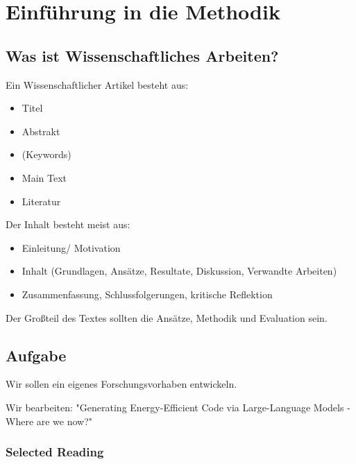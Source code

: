 \documentclass[a4paper]{article}
\title{\docTitle}
\author{Moritz}
\date{\today}
\begin{document}
\maketitle
\tableofcontents


\section{Einführung in die Methodik}

\subsection{Was ist Wissenschaftliches Arbeiten?}

Ein Wissenschaftlicher Artikel besteht aus:

\begin{itemize}
    \item Titel
    \item Abstrakt
    \item (Keywords)
    \item Main Text
    \item Literatur
\end{itemize}

Der Inhalt besteht meist aus:

\begin{itemize}
    \item Einleitung/ Motivation
    \item Inhalt (Grundlagen, Ansätze, Resultate, Diskussion, Verwandte Arbeiten)
    \item Zusammenfassung, Schlussfolgerungen, kritische Reflektion
\end{itemize}

Der Großteil des Textes sollten die Ansätze, Methodik und Evaluation sein.

\subsection{Aufgabe}

Wir sollen ein eigenes Forschungsvorhaben entwickeln.

Wir bearbeiten: "Generating Energy-Efficient Code via Large-Language Models - Where are we now?"

\subsubsection{Selected Reading}
\end{document}
